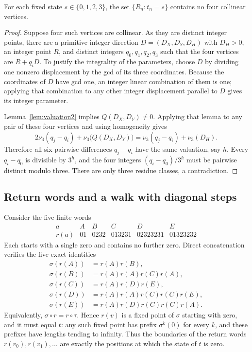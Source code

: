 \documentclass[12pt,reqno]{article}
\newcommand{\vp}{\nu_3}
\begin{document}
\begin{lemma}\label{lem:four}
For each fixed state $s\in\{0,1,2,3\}$, the set
$\{R_n:t_n=s\}$ contains no four collinear vertices.
\end{lemma}
\begin{proof}
Suppose four such vertices are collinear. As they are distinct integer
points, there are a primitive integer direction
$D=(D_X,D_Y,D_H)$ with $D_H>0$, an integer point $R$, and distinct
integers $q_0,q_1,q_2,q_3$ such that the four vertices are $R+q_iD$.
To justify the integrality of the parameters, choose $D$ by dividing
one nonzero displacement by the gcd of its three coordinates. Because
the coordinates of $D$ have gcd one, an integer linear combination
of them is one; applying that combination to any other integer
displacement parallel to $D$ gives its integer parameter.

Lemma~\ref{lem:valuation2} implies $Q(D_X,D_Y)\ne0$. Applying that
lemma to any pair of these four vertices and using homogeneity gives
\[
 2\vp(q_j-q_i)+\vp\bigl(Q(D_X,D_Y)\bigr)
 =\vp(q_j-q_i)+\vp(D_H).
\]
Therefore all six pairwise differences $q_j-q_i$ have the same
valuation, say $h$. Every $q_i-q_0$ is divisible by $3^h$, and the
four integers $(q_i-q_0)/3^h$ must be pairwise distinct modulo three.
There are only three residue classes, a contradiction.
\end{proof}

\subsection{Return words and a walk with diagonal steps}

Consider the five finite words
\[
\begin{array}{c|ccccc}
 a&A&B&C&D&E\\\hline
 r(a)&01&0232&013231&02323231&01323232
\end{array}
\]
Each starts with a single zero and contains no further zero. Direct
concatenation verifies the five exact identities
\begin{align*}
 \sigma(r(A))&=r(A)r(B),\\
 \sigma(r(B))&=r(A)r(A)r(C)r(A),\\
 \sigma(r(C))&=r(A)r(D)r(E),\\
 \sigma(r(D))&=r(A)r(A)r(C)r(C)r(E),\\
 \sigma(r(E))&=r(A)r(D)r(C)r(C)r(A).
\end{align*}
Equivalently, $\sigma\circ r=r\circ\tau$. Hence $r(v)$ is a fixed
point of $\sigma$ starting with zero, and it must equal $t$: any such
fixed point has prefix $\sigma^k(0)$ for every $k$, and these prefixes
have lengths tending to infinity. Thus the boundaries of the return
words $r(v_0),r(v_1),\ldots$ are exactly the positions at which the
state of $t$ is zero.
\end{document}
